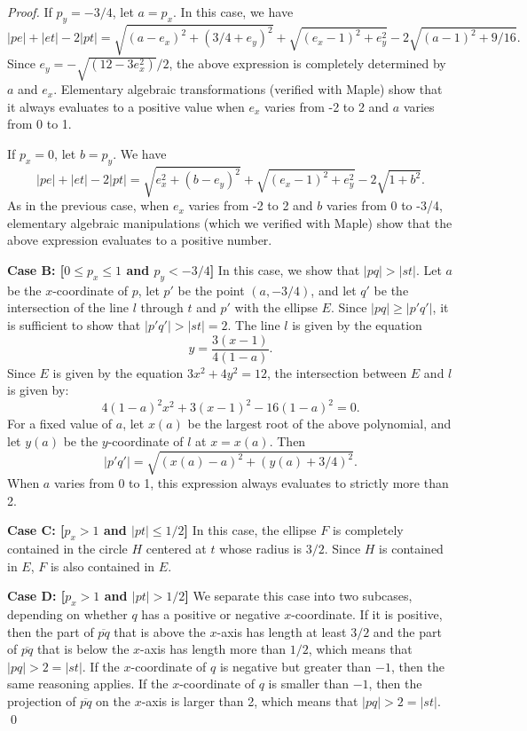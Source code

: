 \documentclass[pdftex,leqno,fleqn,12pts]{llncs}
\begin{document}
\begin{proof}
If $p_y=-3/4$, let $a=p_x$. In this case, we have 
\[ |pe|+|et|-2|pt| = 
    \sqrt{(a-e_x)^2+(3/4+e_y)^2}+\sqrt{(e_x-1)^2+e_y^2} - 
       2\sqrt{(a-1)^2+9/16}.
\] 
Since $e_y=-\sqrt{(12-3e_x^2)}/2$, the above expression is completely 
determined by $a$ and $e_x$. Elementary algebraic transformations (verified with Maple) show that it always
evaluates to a positive value when $e_x$ varies from -2 to 2 and $a$ 
varies from 0 to 1.


If $p_x=0$, let $b=p_y$. We have 
\[ |pe|+|et|-2|pt| = 
    \sqrt{e_x^2+(b-e_y)^2}+\sqrt{(e_x-1)^2+e_y^2}-2\sqrt{1+b^2}.
\] 
As in the previous case, when $e_x$ varies from -2 to 2 and $b$ varies 
from 0 to -3/4, elementary algebraic manipulations (which we verified with Maple) show that the above expression 
evaluates to a positive number.

\vspace{0.5em} 

\noindent 
\textbf{Case B: [$0\leq p_x \leq 1$ and $p_y < -3/4$]} In this case, we show that $|pq|>|st|$. Let $a$ be 
the $x$-coordinate of $p$, let $p'$ be the point $(a,-3/4)$, and let 
$q'$ be the intersection of the line $l$ through $t$ and $p'$ with the 
ellipse $E$. Since $|pq|\geq|p'q'|$, it is sufficient to show that 
$|p'q'| > |st|=2$. The line $l$ is given by the equation 
\[ y = \frac{3(x-1)}{4(1-a)}. 
\] 
Since $E$ is given by the equation $3x^2+4y^2=12$, the intersection 
between $E$ and $l$ is given by:
\[ 4(1-a)^2x^2+3(x-1)^2-16(1-a)^2=0.
\] 
For a fixed value of $a$, let $x(a)$ be the largest root of the above 
polynomial, and let $y(a)$ be the $y$-coordinate of $l$ at $x=x(a)$. 
Then
\[ |p'q'| = \sqrt{(x(a)-a)^2+(y(a)+3/4)^2} . 
\] 
When $a$ varies from 0 to 1, this 
expression always evaluates to strictly more than 2. 

\vspace{0.5em} 

\noindent 
\textbf{Case C: [$p_x>1$ and $|pt| \leq 1/2$]} In this case, the ellipse $F$ is completely contained 
in the circle $H$ centered at $t$ whose radius is $3/2$. Since $H$ is 
contained in $E$, $F$ is also contained in $E$.

\vspace{0.5em} 

\noindent 
\textbf{Case D: [$p_x>1$ and $|pt| > 1/2$]} We separate this case into two subcases, depending on 
whether $q$ has a positive or negative $x$-coordinate. If it is positive, 
then the part of $\overline{pq}$ that is above the $x$-axis has length 
at least $3/2$ and the part of $\overline{pq}$ that is below the $x$-axis 
has length more than $1/2$, which means that $|pq|>2=|st|$. If the 
$x$-coordinate of $q$ is negative but greater than $-1$, then the same 
reasoning applies. If the $x$-coordinate of $q$ is smaller than $-1$, 
then the projection of $\overline{pq}$ on the $x$-axis is larger than 
2, which means that $|pq|>2=|st|$.
\qed 
\end{proof}
\end{document}
